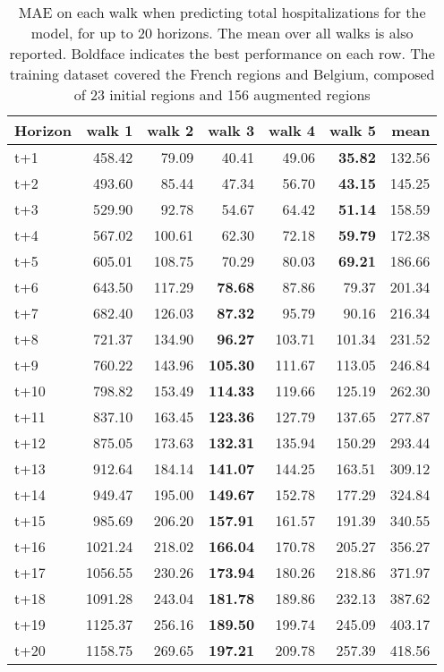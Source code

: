 \begin{table}[H]
\centering
\caption{MAE on each walk when predicting total hospitalizations for the model, for up to 20 horizons. The mean over all walks is also reported. Boldface indicates the best performance on each row. The training dataset covered the French regions and Belgium, composed of 23 initial regions and 156 augmented regions }
\label{tab:MAE_walk_custom_linear_regression}
\begin{tabular}{lrrrrrr}
\toprule
Horizon &  walk 1 &  walk 2 &  walk 3 &  walk 4 &  walk 5 &   mean \\
\midrule
t+1  & 458.42  & 79.09  & 40.41  & 49.06  & \textbf{35.82}  & 132.56  \\
t+2  & 493.60  & 85.44  & 47.34  & 56.70  & \textbf{43.15}  & 145.25  \\
t+3  & 529.90  & 92.78  & 54.67  & 64.42  & \textbf{51.14}  & 158.59  \\
t+4  & 567.02  & 100.61  & 62.30  & 72.18  & \textbf{59.79}  & 172.38  \\
t+5  & 605.01  & 108.75  & 70.29  & 80.03  & \textbf{69.21}  & 186.66  \\
t+6  & 643.50  & 117.29  & \textbf{78.68}  & 87.86  & 79.37  & 201.34  \\
t+7  & 682.40  & 126.03  & \textbf{87.32}  & 95.79  & 90.16  & 216.34  \\
t+8  & 721.37  & 134.90  & \textbf{96.27}  & 103.71  & 101.34  & 231.52  \\
t+9  & 760.22  & 143.96  & \textbf{105.30}  & 111.67  & 113.05  & 246.84  \\
t+10  & 798.82  & 153.49  & \textbf{114.33}  & 119.66  & 125.19  & 262.30  \\
t+11  & 837.10  & 163.45  & \textbf{123.36}  & 127.79  & 137.65  & 277.87  \\
t+12  & 875.05  & 173.63  & \textbf{132.31}  & 135.94  & 150.29  & 293.44  \\
t+13  & 912.64  & 184.14  & \textbf{141.07}  & 144.25  & 163.51  & 309.12  \\
t+14  & 949.47  & 195.00  & \textbf{149.67}  & 152.78  & 177.29  & 324.84  \\
t+15  & 985.69  & 206.20  & \textbf{157.91}  & 161.57  & 191.39  & 340.55  \\
t+16  & 1021.24  & 218.02  & \textbf{166.04}  & 170.78  & 205.27  & 356.27  \\
t+17  & 1056.55  & 230.26  & \textbf{173.94}  & 180.26  & 218.86  & 371.97  \\
t+18  & 1091.28  & 243.04  & \textbf{181.78}  & 189.86  & 232.13  & 387.62  \\
t+19  & 1125.37  & 256.16  & \textbf{189.50}  & 199.74  & 245.09  & 403.17  \\
t+20  & 1158.75  & 269.65  & \textbf{197.21}  & 209.78  & 257.39  & 418.56  \\

\bottomrule
\end{tabular}
\end{table}
